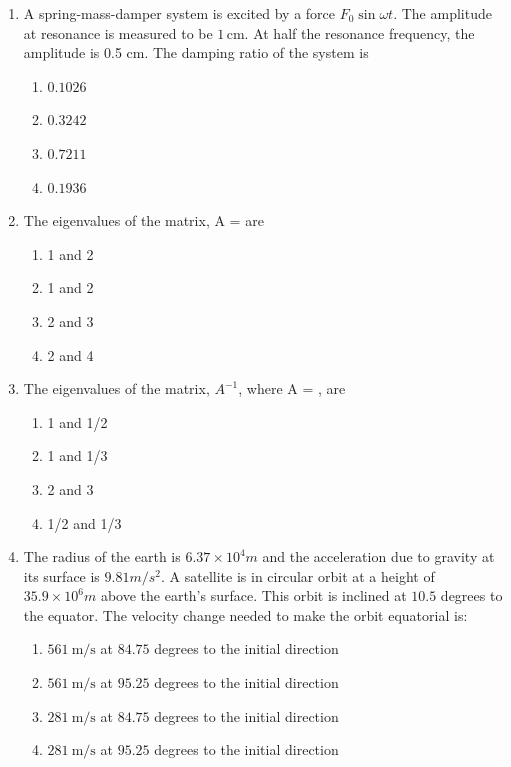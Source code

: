 \documentclass{article}
\begin{document}
\begin{enumerate}
    \item A spring-mass-damper system is excited by a force $F_0 \sin \omega t$. The amplitude at resonance is measured to be $1 \, \mathrm{cm}$. At half the resonance frequency, the amplitude is 0.5 cm. The damping ratio of the system is 
    \begin{multicols}{4}
    \begin{enumerate}
        \item $0.1026$ \quad
        \item $0.3242$ \quad
        \item $0.7211$ \quad
        \item $0.1936$
    \end{enumerate}
    \end{multicols}
        

    \item The eigenvalues of the matrix, 
    A =
    are 
    \begin{multicols}{2}
    \begin{enumerate}
        \item 1 and 2 
        \item 1 and 2
        \item 2 and 3 
        \item 2 and 4
    \end{enumerate}
    \end{multicols}
        

    \item The eigenvalues of the matrix, $A^{-1}$, where A = , are 
    \begin{multicols}{2}
    \begin{enumerate}
        \item 1 and 1/2 
        \item 1 and 1/3
        \item 2 and 3 
        \item 1/2 and 1/3
    \end{enumerate}
    \end{multicols}
        
  
    \item The radius of the earth is $6.37 \times 10^4 m$ and the acceleration due to gravity at its surface is $9.81 m/s^2$. A satellite is in circular orbit at a height of $35.9 \times 10^6 m$ above the earth's surface. This orbit is inclined at $10.5$ degrees to the equator. The velocity change needed to make the orbit equatorial is: 
    \begin{enumerate}
        \item $561\ \mathrm{m/s}$ at $84.75$ degrees to the initial direction
        \item $561\ \mathrm{m/s}$ at $95.25$ degrees to the initial direction
        \item $281\ \mathrm{m/s}$ at $84.75$ degrees to the initial direction
        \item $281\ \mathrm{m/s}$ at $95.25$ degrees to the initial direction
    \end{enumerate}
        


\end{enumerate}
\end{document}
